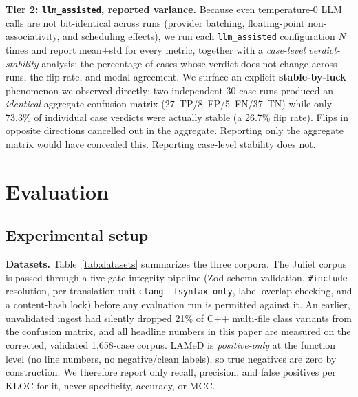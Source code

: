 \documentclass[11pt,a4paper]{article}
\begin{document}
\textbf{Tier 2: \texttt{llm\_assisted}, reported variance.} Because
even temperature-0 LLM calls are not bit-identical across runs (provider
batching, floating-point non-associativity, and scheduling effects), we
run each \texttt{llm\_assisted} configuration $N$ times and report
mean$\pm$std for every metric, together with a \emph{case-level
verdict-stability} analysis: the percentage of cases whose verdict does
not change across runs, the flip rate, and modal agreement. We surface an
explicit \textbf{stable-by-luck} phenomenon we observed directly: two
independent 30-case runs produced an \emph{identical} aggregate confusion
matrix (27~TP/8~FP/5~FN/37~TN) while only 73.3\% of individual case
verdicts were actually stable (a 26.7\% flip rate). Flips in opposite
directions cancelled out in the aggregate. Reporting only the aggregate
matrix would have concealed this. Reporting case-level stability does not.

\section{Evaluation}
\label{sec:evaluation}

\subsection{Experimental setup}

\textbf{Datasets.} Table~\ref{tab:datasets} summarizes the three corpora.
The Juliet corpus is passed through a five-gate integrity pipeline (Zod
schema validation, \texttt{\#include} resolution, per-translation-unit
\texttt{clang -fsyntax-only}, label-overlap checking, and a content-hash
lock) before any evaluation run is permitted against it. An earlier,
unvalidated ingest had silently dropped 21\% of C++ multi-file class
variants from the confusion matrix, and all headline numbers in this
paper are measured on the corrected, validated 1{,}658-case corpus. LAMeD
is \emph{positive-only} at the function level (no line numbers, no
negative/clean labels), so true negatives are zero by construction. We
therefore report only recall, precision, and false positives per KLOC for
it, never specificity, accuracy, or MCC.
\end{document}
